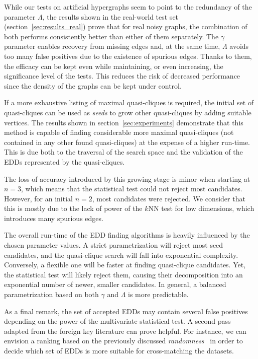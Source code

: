 While our tests on artificial hypergraphs seem to point to the redundancy of the parameter $\Lambda$,
the results shown in the real-world test set (section~\ref{sec:results_real}) prove that for real noisy graphs,
the combination of both performs consistently better than
either of them separately. The $\gamma$ parameter enables recovery from missing edges and,
at the same time, $\Lambda$ avoids too many false positives due to the existence of
spurious edges. Thanks to them, the efficacy can be kept even while maintaining, or even
increasing, the significance level of the tests. This reduces the risk of decreased
performance since the density of the graphs can be kept under control.

If a more exhaustive listing of maximal quasi-cliques is required, the initial set of
quasi-cliques can be used as \emph{seeds} to grow other quasi-cliques by adding suitable vertices.
The results shown in  section~\ref{sec:experiments} demonstrate that this method is capable of
finding considerable more maximal quasi-cliques (not contained in any other found quasi-cliques)
at the expense of a higher run-time. This is due both to the traversal of the search space and the
validation of the EDDs represented by the quasi-cliques.

The loss of accuracy introduced by this growing stage is minor when starting at $n = 3$,
which means that the statistical test could not reject most candidates. However, for an
initial $n = 2$, most candidates were rejected. We consider that this is mostly due
to the lack of power of the $k$NN test for low dimensions, which introduces
many spurious edges.

The overall run-time of the EDD finding algorithms is heavily influenced by the
chosen parameter values.
A strict parametrization will reject most seed candidates, and the quasi-clique search will fall
into exponential complexity. Conversely, a flexible one will be faster at finding
quasi-clique candidates. Yet, the statistical test will likely reject them, causing their decomposition
into an exponential number of newer, smaller candidates.
In general, a balanced parametrization based on both $\gamma$ and $\Lambda$ is more predictable.

As a final remark, the set of accepted EDDs may contain several false positives depending on the power of
the multivariate statistical test. A second pass adapted from the foreign key literature can prove helpful.
For instance, we can envision a ranking based on the previously discussed \emph{randomness}~\cite{Zhang2010}
in order to decide which set of EDDs is more suitable for cross-matching the datasets.

